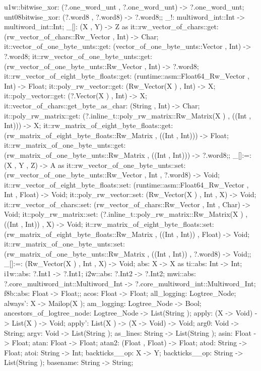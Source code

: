     u1w::bitwise_xor: (?.one_word_unt , ?.one_word_unt) -> ?.one_word_unt;
    unt08bitwise_xor: (?.word8 , ?.word8) -> ?.word8;;
_!: multiword_int::Int -> multiword_int::Int;
_[]:
(X , Y) -> Z
as  it::rw_vector_of_chars::get: (rw_vector_of_chars::Rw_Vector , Int) -> Char;
    it::vector_of_one_byte_unts::get: (vector_of_one_byte_unts::Vector , Int) -> ?.word8;
    it::rw_vector_of_one_byte_unts::get: (rw_vector_of_one_byte_unts::Rw_Vector , Int) -> ?.word8;
    it::rw_vector_of_eight_byte_floats::get: (runtime::asm::Float64_Rw_Vector , Int) -> Float;
    it::poly_rw_vector::get: (Rw_Vector(X ) , Int) -> X;
    it::poly_vector::get: (?.Vector(X ) , Int) -> X;
    it::vector_of_chars::get_byte_as_char: (String , Int) -> Char;
    it::poly_rw_matrix::get: (?.inline_t::poly_rw_matrix::Rw_Matrix(X ) , ((Int , Int))) -> X;
    it::rw_matrix_of_eight_byte_floats::get:
    (rw_matrix_of_eight_byte_floats::Rw_Matrix , ((Int , Int))) -> Float;
    it::rw_matrix_of_one_byte_unts::get:
    (rw_matrix_of_one_byte_unts::Rw_Matrix , ((Int , Int))) -> ?.word8;;
_[]:=:
(X , Y , Z) -> A
as  it::rw_vector_of_one_byte_unts::set:
    (rw_vector_of_one_byte_unts::Rw_Vector , Int , ?.word8) -> Void;
    it::rw_vector_of_eight_byte_floats::set: (runtime::asm::Float64_Rw_Vector , Int , Float) -> Void;
    it::poly_rw_vector::set: (Rw_Vector(X ) , Int , X) -> Void;
    it::rw_vector_of_chars::set: (rw_vector_of_chars::Rw_Vector , Int , Char) -> Void;
    it::poly_rw_matrix::set: (?.inline_t::poly_rw_matrix::Rw_Matrix(X ) , ((Int , Int)) , X) -> Void;
    it::rw_matrix_of_eight_byte_floats::set:
    (rw_matrix_of_eight_byte_floats::Rw_Matrix , ((Int , Int)) , Float) -> Void;
    it::rw_matrix_of_one_byte_unts::set:
    (rw_matrix_of_one_byte_unts::Rw_Matrix , ((Int , Int)) , ?.word8) -> Void;;
_[]:=: (Rw_Vector(X ) , Int , X) -> Void;
abs:
X -> X
as  ti::abs: Int -> Int;
    i1w::abs: ?.Int1 -> ?.Int1;
    i2w::abs: ?.Int2 -> ?.Int2;
    mwi::abs: ?.core_multiword_int::Multiword_Int -> ?.core_multiword_int::Multiword_Int;
    f8b::abs: Float -> Float;;
acos: Float -> Float;
all_logging: Logtree_Node;
always': X -> Mailop(X );
am_logging: Logtree_Node -> Bool;
ancestors_of_logtree_node: Logtree_Node -> List(String );
apply: (X -> Void) -> List(X ) -> Void;
apply': List(X ) -> (X -> Void) -> Void;
arg0: Void -> String;
argv: Void -> List(String );
as_lines: String -> List(String );
asin: Float -> Float;
atan: Float -> Float;
atan2: (Float , Float) -> Float;
atod: String -> Float;
atoi: String -> Int;
backticks__op: X -> Y;
backticks__op: String -> List(String );
basename: String -> String;
